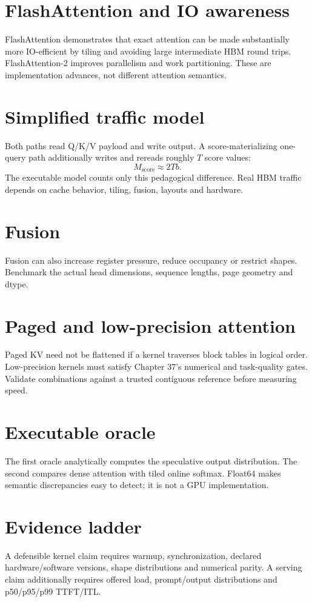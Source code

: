 \section{FlashAttention and IO awareness}
FlashAttention demonstrates that exact attention can be made substantially more IO-efficient by tiling and avoiding large intermediate HBM round trips. FlashAttention-2 improves parallelism and work partitioning. These are implementation advances, not different attention semantics.

\section{Simplified traffic model}
Both paths read Q/K/V payload and write output. A score-materializing one-query path additionally writes and rereads roughly $T$ score values:
\[
M_{\mathrm{score}}\approx 2Tb.
\]
The executable model counts only this pedagogical difference. Real HBM traffic depends on cache behavior, tiling, fusion, layouts and hardware.

\section{Fusion}
Fusion can also increase register pressure, reduce occupancy or restrict shapes. Benchmark the actual head dimensions, sequence lengths, page geometry and dtype.

\section{Paged and low-precision attention}
Paged KV need not be flattened if a kernel traverses block tables in logical order. Low-precision kernels must satisfy Chapter 37's numerical and task-quality gates. Validate combinations against a trusted contiguous reference before measuring speed.

\section{Executable oracle}
The first oracle analytically computes the speculative output distribution. The second compares dense attention with tiled online softmax. Float64 makes semantic discrepancies easy to detect; it is not a GPU implementation.

\section{Evidence ladder}
A defensible kernel claim requires warmup, synchronization, declared hardware/software versions, shape distributions and numerical parity. A serving claim additionally requires offered load, prompt/output distributions and p50/p95/p99 TTFT/ITL.

